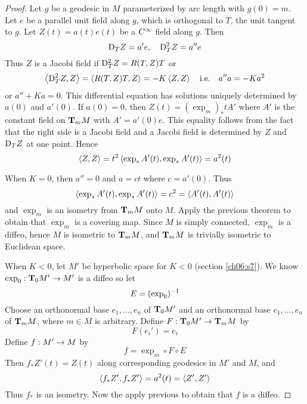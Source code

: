 \documentclass[../main]{subfiles}
\begin{document}
\begin{proof}
Let $g$ be a geodesic in $M$ parameterized by arc length with $g(0)=m$. Let $e$ be a parallel unit field along $g$, which is orthogonal to $T$, the unit tangent to $g$. Let $Z(t)=a(t)e(t)$ be a $\CInfty$ field along $g$. Then
\[\D_TZ=a'e,
\quad \D_T^2Z=a''e\]
Thus $Z$ is a Jacobi field if $\D_T^2Z=R(T,Z)T$ or
\[\ip{\D_T^2Z}{Z} = \ip{R(T,Z)T}{Z}
= -K\ip ZZ
\quad \text{i.e.}
\quad a''a = -Ka^2\]
or $a''+Ka=0$. This differential equation has solutions uniquely determined by $a(0)$ and $a'(0)$. If $a(0)=0$, then $Z(t)=(\exp_m)_*tA'$ where $A'$ is the constant field on $\ts Mm$ with $A'=a'(0)e$. This equality follows from the fact that the right side is a Jacobi field and a Jacobi field is determined by $Z$ and $\D_TZ$ at one point. Hence
\[\ip ZZ = t^2\ip{\exp_*A'(t)}{\exp_*A'(t)}
= a^2(t)\]

When $K=0$, then $a''=0$ and $a=ct$ where $c=a'(0)$. Thus
\[\ip{\exp_*A'(t)}{\exp_*A'(t)} = c^2
= \ip{A'(t)}{A'(t)}\]
and $\exp_m$ is an isometry from $\ts Mm$ onto $M$. Apply the previous theorem to obtain that $\exp_m$ is a covering map. Since $M$ is simply connected, $\exp_m$ is a diffeo, hence $M$ is isometric to $\ts Mm$, and $\ts Mm$ is trivially isometric to Euclidean space.

When $K<0$, let $M'$ be hyperbolic space for $K<0$ (section \ref{ch06:s7}). We know $\exp_0:\ts{M'}{0}\functionMaps M'$ is a diffeo so let
\[E=(\exp_0)\inv\]
Choose an orthonormal base $e_1,\ldots,e_n$ of $\ts{M'}{0}$ and an orthonormal base $e_1,\ldots,e_n$ of $\ts Mm$, where $m\in M$ is arbitrary. Define $F:\ts{M'}{0}\functionMaps\ts Mm$ by
\[F(e_i')=e_i\]
Define $f:M'\functionMaps M$ by
\[f=\exp_m\circ F\circ E\]
Then $f_*Z'(t)=Z(t)$ along corresponding geodesics in $M'$ and $M$, and
\[\ip{f_*Z'}{f_*Z'} = a^2(t)
= \ip{Z'}{Z'}\]
Thus $f_*$ is an isometry. Now the apply previous to obtain that $f$ is a diffeo.


\end{proof}
\end{document}
